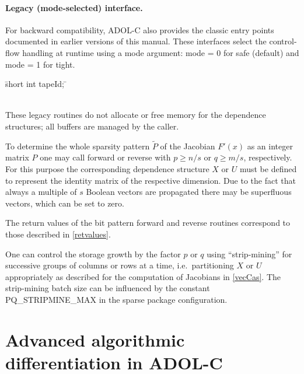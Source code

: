 \documentclass[11pt,twoside]{article}
\begin{document}
\paragraph{Legacy (mode-selected) interface.}
For backward compatibility, ADOL-C also provides the classic entry points
documented in earlier versions of this manual. These interfaces select the
control-flow handling at runtime using a {\sf mode} argument:
{\sf mode = 0} for safe (default) and {\sf mode = 1} for tight.
%
\begin{tabbing}
\hspace{0.5in}\={\sf short int tapeId;} \hspace{1.1in}\= \kill
{}\\
\\
\end{tabbing}
%
These legacy routines do not allocate or free memory for the dependence
structures; all buffers are managed by the caller.

To determine the whole sparsity pattern $\tilde{P}$ of the Jacobian $F'(x)$
as an integer matrix $P$ one may call {\sf forward} or {\sf reverse}
with $p \ge n/s$ or $q \ge m/s$, respectively. For this purpose the
corresponding dependence structure $X$ or $U$ must be defined to represent
the identity matrix of the respective dimension.
Due to the fact that always a multiple of $s$ Boolean vectors are propagated
there may be superfluous vectors, which can be set to zero.

The return values of the bit pattern {\sf forward} and {\sf reverse} routines
correspond to those described in \autoref{retvalues}.

One can control the storage growth by the factor $p$ or $q$ using
``strip-mining'' for successive groups of columns or rows at a time, i.e.\
partitioning $X$ or $U$ appropriately as described for the computation of
Jacobians in \autoref{vecCas}. The strip-mining batch size can be influenced
by the constant {\sf PQ\_STRIPMINE\_MAX} in the sparse package configuration.

%
\section{Advanced algorithmic differentiation in ADOL-C}
\label{adv_ad}
%
\end{document}
